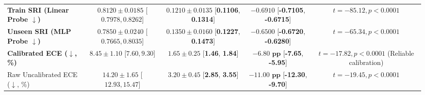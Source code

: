 \documentclass[a4paper,fleqn]{cas-sc}
\begin{document}
\begin{table}[t]
{\begin{tabular}{lcccc}
\textbf{Train SRI (Linear Probe $\downarrow$)} & $0.8120 \pm 0.0185$ [$0.7978, 0.8262$] & $\mathbf{0.1210 \pm 0.0135}$ [\textbf{0.1106}, \textbf{0.1314}] & $\mathbf{-0.6910}$ [\textbf{-0.7105}, \textbf{-0.6715}] & $t = -85.12, p < 0.0001$ \\
\textbf{Unseen SRI (MLP Probe $\downarrow$)} & $0.7850 \pm 0.0240$ [$0.7665, 0.8035$] & $\mathbf{0.1350 \pm 0.0160}$ [\textbf{0.1227}, \textbf{0.1473}] & $\mathbf{-0.6500}$ [\textbf{-0.6720}, \textbf{-0.6280}] & $t = -65.34, p < 0.0001$ \\
\textbf{Calibrated ECE ($\downarrow$, \%)} & $8.45 \pm 1.10$ [$7.60, 9.30$] & $\mathbf{1.65 \pm 0.25}$ [\textbf{1.46}, \textbf{1.84}] & $\mathbf{-6.80\text{ pp}}$ [\textbf{-7.65}, \textbf{-5.95}] & $t = -17.82, p < 0.0001$ (Reliable calibration) \\
Raw Uncalibrated ECE ($\downarrow$, \%) & $14.20 \pm 1.65$ [$12.93, 15.47$] & $\mathbf{3.20 \pm 0.45}$ [\textbf{2.85}, \textbf{3.55}] & $\mathbf{-11.00\text{ pp}}$ [\textbf{-12.30}, \textbf{-9.70}] & $t = -19.45, p < 0.0001$ \\
\bottomrule
\end{tabular}%
}
\end{table}
\end{document}
